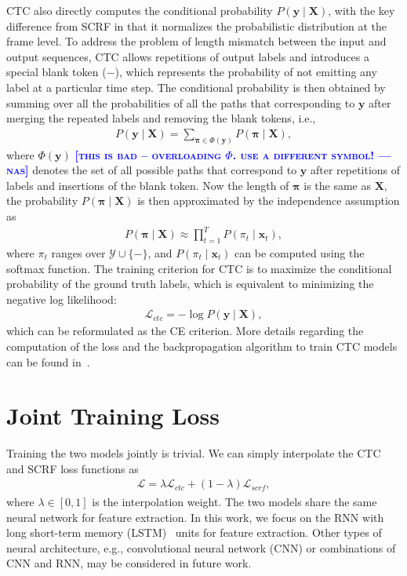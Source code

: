 \documentclass[a4paper]{article}
\newcommand{\nascomment}[1]{\textcolor{blue}{\textbf{\textsc{[#1 ---nas]}}}}
\begin{document}
CTC also directly computes the conditional probability $P(\bm y \mid \bm X)$, with the key difference from SCRF in that it normalizes the probabilistic distribution at the frame level. To address the problem of length mismatch between the input and output sequences, CTC allows repetitions of output labels and introduces a special  blank token ($-$), which represents the probability of not emitting any label at a particular time step. The conditional probability is then obtained by summing over all the probabilities of all the paths that corresponding to $\bm y$ after merging the repeated labels and removing the blank tokens, i.e.,
\begin{align} 
P(\bm y \mid \bm X) = \sum_{\bm \pi \in \Phi(\bm y)} P(\bm \pi \mid \bm X),
\end{align}
where $\Phi(\bm y)$ \nascomment{this is bad -- overloading $\Phi$.  use a different symbol!}  denotes the set of all  possible paths that correspond to $\bm y$ after repetitions of labels and insertions of the blank token. Now the length of $\bm \pi$ is the same as $\bm X$, the probability $P(\bm \pi \mid \bm X)$ is then approximated by the independence assumption as 
\begin{align} 
P(\bm \pi \mid \bm X) \approx \prod_{t=1}^T P(\pi_t \mid \bm x_t),
\end{align}
where $\pi_t $ ranges over $\mathcal{Y}\cup \{-\}$, and $P(\pi_t \mid \bm x_t)$ can be computed using the softmax function. The training criterion for CTC is to maximize the conditional probability of the ground truth labels, which is equivalent to minimizing the negative log likelihood:
\begin{align} 
\mathcal L_{\mathit{ctc}} = -\log P(\bm y \mid \bm X),
\end{align}
which can be reformulated as the CE criterion. More details regarding the computation of the loss and the backpropagation algorithm to train CTC models can be found in~\cite{graves2006connectionist}. 


\section{Joint Training Loss}

Training the two models jointly is trivial.  We can simply interpolate the CTC and SCRF loss functions as
\begin{align} 
\label{eq:mtl}
\mathcal L = \lambda \mathcal{L}_{\mathit{ctc}} + (1-\lambda)\mathcal{L}_{\mathit{scrf}},
\end{align}
where $\lambda \in[0, 1]$ is the interpolation weight. The two models share the same neural network for feature extraction. In this work, we focus on the RNN with long short-term memory (LSTM)~\cite{hochreiter1997long} units for feature extraction. Other types of neural architecture, e.g., convolutional neural network (CNN) or combinations of CNN and RNN, may be considered in future work. 
\end{document}
